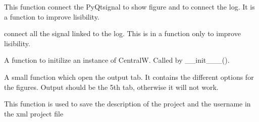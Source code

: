 \documentclass[letterpaper,10pt,english]{sphinxmanual}
\begin{document}
\begin{fulllineitems}
\begin{fulllineitems}
\end{fulllineitems}


\begin{fulllineitems}
\label{\detokenize{index:src_GUI.Main_windows_1.CentralW.connect_signal_fig_and_drop}}
This function connect the PyQtsignal to show figure and to connect the log. It is a function to
improve lisibility.

\end{fulllineitems}


\begin{fulllineitems}
\label{\detokenize{index:src_GUI.Main_windows_1.CentralW.connect_signal_log}}
connect all the signal linked to the log. This is in a function only to improve lisibility.

\end{fulllineitems}


\begin{fulllineitems}
\label{\detokenize{index:src_GUI.Main_windows_1.CentralW.init_iu}}
A function to initilize an instance of CentralW. Called by \_\_init\_\_\_().

\end{fulllineitems}


\begin{fulllineitems}
\label{\detokenize{index:src_GUI.Main_windows_1.CentralW.optfig}}
A small function which open the output tab. It contains the different options for the figures.
Output should be the 5th tab, otherwise it will not work.

\end{fulllineitems}


\begin{fulllineitems}
\label{\detokenize{index:src_GUI.Main_windows_1.CentralW.save_info_projet}}
This function is used to save the description of the project and the username in the xml project file


\end{fulllineitems}
\end{fulllineitems}
\end{document}
